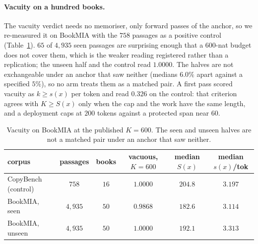 \paragraph{Vacuity on a hundred books.}\label{app:bookmia}
The vacuity verdict needs no memoriser, only forward passes of the anchor, so we re-measured it on BookMIA
\citep{shi2024detecting} with the $758$ passages as a positive control (Table~\ref{tab:bookmia}). $65$ of
$4{,}935$ seen passages are surprising enough that a $600$-nat budget does not cover them, which is the
weaker reading registered rather than a replication; the unseen half and the control read $1.0000$. The
halves are not exchangeable under an anchor that saw neither (medians $6.0\%$ apart against a specified
$5\%$), so no arm treats them as a matched pair. A first pass scored vacuity as $k \ge s(x)$ per token and
read $0.326$ on the control: that criterion agrees with $K \ge S(x)$ only when the cap and the work have
the same length, and a deployment caps at $200$ tokens against a protected span near $60$.

\begin{table}[ht]
\centering\footnotesize
\caption{Vacuity on BookMIA at the published $K = 600$. The seen and unseen halves are not a matched pair
under an anchor that saw neither.}\label{tab:bookmia}
\setlength{\tabcolsep}{4pt}
\begin{tabular}{@{}lccccc@{}}
\toprule
corpus & passages & books & vacuous, $K = 600$ & median $S(x)$ & median $s(x)$/tok \\
\midrule
CopyBench (control) & $758$   & $16$ & $1.0000$ & $204.8$ & $3.197$ \\
BookMIA, seen       & $4{,}935$ & $50$ & $0.9868$ & $182.6$ & $3.114$ \\
BookMIA, unseen     & $4{,}935$ & $50$ & $1.0000$ & $192.1$ & $3.313$ \\
\bottomrule
\end{tabular}
\end{table}

